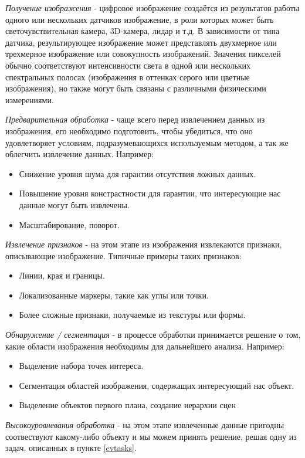 \documentclass[specification,annotation,times]{itmo-student-thesis}
\begin{document}
\textit{Получение изображения} - цифровое изображение создаётся из результатов работы одного или нескольких датчиков изображение, в роли которых может быть светочувствительная камера, 3D-камера, лидар и т.д.  В зависимости от типа датчика, результирующее изображение может представлять  двухмерное или трехмерное изображение или совокупность изображений. Значения пикселей обычно соответствуют интенсивности света в одной или нескольких спектральных полосах (изображения в оттенках серого или цветные изображения), но также могут быть связаны с различными физическими измерениями. 

\textit{Предварительная обработка} - чаще всего перед извлечением данных из изображения, его необходимо подготовить, чтобы убедиться, что оно удовлетворяет условиям, подразумевающихся используемым методом, а так же облегчить извлечение данных. Например:
\begin{itemize}
	\item  Снижение уровня шума для гарантии отсутствия ложных данных.
	\item Повышение уровня констрастности для гарантии, что интересующие нас данные могут быть извлечены.
	\item Масштабирование, поворот.
\end{itemize}

\textit{Извлечение признаков }-  на этом этапе из изображения извлекаются признаки, описывающие изображение. 
Типичные примеры таких признаков:
\begin{itemize}
	\item  Линии, края и границы.
	\item Локализованные маркеры, такие как углы или точки.
	\item Более сложные признаки, получаемые из текстуры или формы. 
\end{itemize}

\textit{Обнаружение / сегментация} - в процессе обработки принимается решение о том, какие области изображения необходимы для дальнейшего анализа. Например:
\begin{itemize}
	\item  Выделение набора точек интереса.
	\item Сегментация областей изображения, содержащих интересующий нас объект.
	\item Выделение объектов первого плана, создание иерархии сцен
\end{itemize}

\textit{Высокоуровневания обработка} - на этом этапе извлеченные данные пригодны соотвествуют какому-либо объекту и мы можем принять решение, решая одну из задач, описанных  в пункте \ref{cvtasks}.
\end{document}
